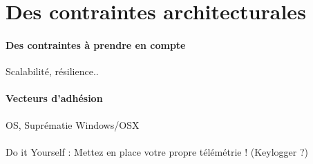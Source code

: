\section{Des contraintes architecturales}
\paragraph{Des contraintes à prendre en compte} Scalabilité, résilience..
\paragraph{Vecteurs d'adhésion} OS, Suprématie Windows/OSX

\paragraph{} Do it Yourself : Mettez en place votre propre télémétrie ! (Keylogger ?)

